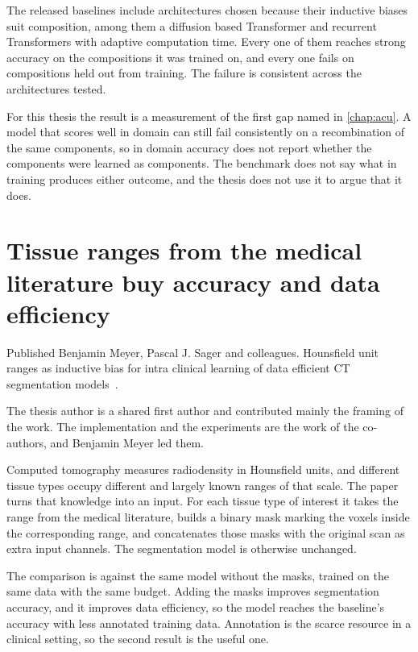 The released baselines include architectures chosen because their inductive
biases suit composition, among them a diffusion based Transformer and
recurrent Transformers with adaptive computation time. Every one of them
reaches strong accuracy on the compositions it was trained on, and every one
fails on compositions held out from training. The failure is consistent across
the architectures tested.

For this thesis the result is a measurement of the first gap named in
\cref{chap:acu}. A model that scores well in domain can still fail
consistently on a recombination of the same components, so in domain accuracy does not
report whether the components were learned as components. The benchmark does
not say what in training produces either outcome, and the thesis does not use
it to argue that it does.

\section{Tissue ranges from the medical literature buy accuracy and data efficiency}
\label{sec:hounsfield}

\begin{publicationbasis}{Published}
Benjamin Meyer, Pascal J. Sager and colleagues. Hounsfield unit ranges as
inductive bias for intra clinical learning of data efficient CT segmentation
models~\cite{meyer_hounsfield_2025}.
\end{publicationbasis}

The thesis author is a shared first author and contributed mainly the framing
of the work. The implementation and the experiments are the work of the
co-authors, and Benjamin Meyer led them.

Computed tomography measures radiodensity in Hounsfield units, and different
tissue types occupy different and largely known ranges of that scale. The
paper turns that knowledge into an input. For each tissue type of interest it
takes the range from the medical literature, builds a binary mask marking the
voxels inside the corresponding range, and concatenates those masks with the
original scan as extra input channels. The segmentation model is otherwise
unchanged.

The comparison is against the same model without the masks, trained on the
same data with the same budget. Adding the masks improves segmentation
accuracy, and it improves data efficiency, so the model reaches the baseline's
accuracy with less annotated training data. Annotation is the scarce resource
in a clinical setting, so the second result is the useful one.

